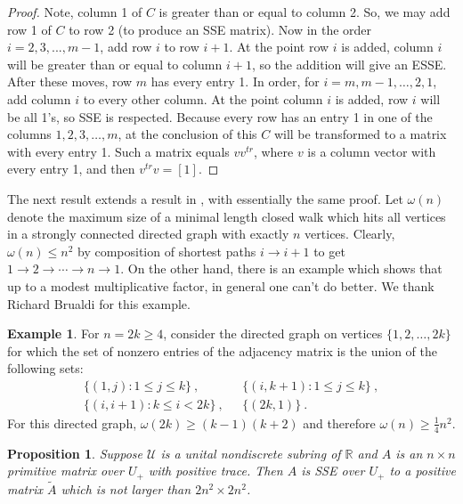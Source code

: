\documentclass{amsart}
\newtheorem{proposition}[theorem]{Proposition}
\theoremstyle{definition}
\newtheorem{example}[theorem]{Example}
\theoremstyle{remark}
\numberwithin{equation}{section}
\begin{document}
{{\begin{proof}
Note, column 1 of $C$ is greater than or equal to column 2. 
So, we may add row 1 of $C$  to row 2 (to produce an SSE matrix). 
Now in the order $i=2,3, ..., m-1$, add row $i$ to row $i+1$. 
At the point row $i$ is added, column $i$ will be greater than or 
equal to column $i+1$, so the addition will 
give an ESSE.  After these moves, row $m$ has every entry 1. 
 In order, for $i=m, m-1, \dots , 2,1$, add column 
$i$ to every other column. At the point column $i$ is added, 
row $i$ will be all 1's, so SSE is respected.  Because every row 
has an entry 1 in one of the columns $1,2,3,\dots , m$, at the conclusion 
of this $C$ will be transformed to a matrix with every entry 1. 
Such a matrix equals $vv^{tr}$, where $v$ is a column vector with every 
entry 1, and then $v^{tr}v=[1]$. 
\end{proof} 

The next result extends a result in \cite{KR3}, with essentially
the same proof. Let $\omega(n)$ denote the maximum size of a minimal 
length closed walk which hits all vertices 
in a strongly connected directed graph with exactly $n$ vertices. 
Clearly, $\omega (n)\leq n^2$ by composition of shortest paths 
$i\to i+1$ to get $1\to 2 \to\cdots \to n \to 1$.
On the other hand, there is an example which shows that up to a 
modest multiplicative factor, in general one can't do better. 
We thank Richard Brualdi for this example. 

\begin{example}\label{brualdiexample}  For $n=2k\geq 4$, 
 consider  
the directed graph on vertices $\{1,2, \dots , 2k\}$ 
for which the set of nonzero entries of the adjacency matrix 
is the union of the following  sets:  
\begin{align*}
\{ (1,j):1\leq j \leq k\} \ , \ \ \ 
& \{ (i,k+1):1\leq j \leq k\} \ ,  \\ 
\{ (i,i+1):k\leq i <2k\}\ , \ \ \ 
&\{ (2k,1)\} \ .
\end{align*}  
For this directed graph, 
$\omega (2k)\geq (k-1)(k+2)$ and therefore 
$\omega (n)\geq \frac 14 n^2$. 
 \end{example} 

\begin{proposition} \label{primtopos} 
Suppose $\mathcal U$ is a unital nondiscrete subring 
of $\mathbb R$ and $A$ is an $n\times n$  primitive 
matrix over $U_+$ with positive trace. 
Then $A$ is SSE over $U_+$
to a positive matrix $\widetilde A$ 
which is not larger than $2n^2\times 2n^2$. 
\end{proposition} 

}}
\end{document}
